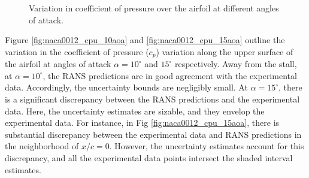 \begin{figure}
\center
{}
\caption{Variation in coefficient of pressure over the airfoil at different angles of attack.}
\end{figure}

Figure \ref{fig:naca0012_cpu_10aoa} and \ref{fig:naca0012_cpu_15aoa} outline the variation in the coefficient of pressure ($c_p$) variation along the upper surface of the airfoil at angles of attack $\alpha=10^{\circ}$ and $15^{\circ}$ respectively.
Away from the stall, at $\alpha=10^{\circ}$, the RANS predictions are in good agreement with the experimental data.
Accordingly, the uncertainty bounds are negligibly small.
At $\alpha=15^{\circ}$, there is a significant discrepancy between the RANS predictions and the experimental data.
Here, the uncertainty estimates are sizable, and they envelop the experimental data.
For instance, in Fig \ref{fig:naca0012_cpu_15aoa}, there is substantial discrepancy between the experimental data and RANS predictions in the neighborhood of $x/c=0$.
However, the uncertainty estimates account for this discrepancy, and all the experimental data points intersect the shaded interval estimates.

